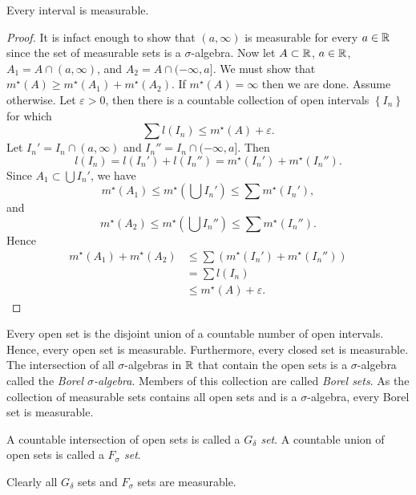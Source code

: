 
\begin{lemma}[]
	Every interval is measurable.
\end{lemma}

\begin{proof}
	It is infact enough to show that $(a, \infty)$ is measurable for every
	$a \in \mathbb{R}$ since the set of measurable sets is a $\sigma$-algebra.
	Now let $A \subset \mathbb{R}$, $a \in \mathbb{R}$, $A_1 = A \cap (a, \infty)$, and
	$A_2 = A \cap (-\infty, a]$.
	We must show that $
		m^\star(A) \geq m^\star(A_1) + m^\star(A_2)
	$.
	If $m^\star(A) = \infty$ then we are done. Assume otherwise.
	Let $\varepsilon > 0$, then there is a countable collection of open
	intervals $\left\{
		I_n
	\right\}$ for which \[
		\sum l(I_n) \leq m^\star(A) + \varepsilon.
	\]
	Let 
	$I_n' = I_n \cap (a, \infty)$ 
	and
	$I_n'' = I_n \cap (-\infty, a]$.
	Then
	\[
		l(I_n) = l(I_n') + l(I_n'') = m^\star(I_n') + m^\star(I_n'').
	\]
	Since $A_1 \subset \bigcup I_n'$, we have
	\[
		m^\star(A_1) \leq m^\star\left( 
			\bigcup I_n' 
		\right)
		\leq \sum m^\star(I_n'),
	\]
	and
	\[
		m^\star(A_2) \leq m^\star\left( 
			\bigcup I_n'' 
		\right)
		\leq \sum m^\star(I_n'').
	\]
	Hence
	\begin{align*}
		m^\star(A_1) + m^\star(A_2)
		&\leq \sum \left( 
			m^\star(I_n') + m^\star(I_n'') 
		\right) \\
		&= \sum l(I_n) \\
		&\leq m^\star(A) + \varepsilon.
	\end{align*}
\end{proof}

Every open set is the disjoint union of a countable number of open intervals.
Hence, every open set is measurable.
Furthermore, every closed set is measurable.
The intersection of all $\sigma$-algebras in $\mathbb{R}$ that contain the open sets is a $\sigma$-algebra called the \emph{Borel $\sigma$-algebra}.
Members of this collection are called \emph{Borel sets}.
As the collection of measurable sets contains all open sets and is a
$\sigma$-algebra, every Borel set is measurable.

\begin{definition}
	A countable intersection of open sets is called a
	\emph{$G_\delta$ set}.
	A countable union of open sets is called a
	\emph{$F_\sigma$ set}.
\end{definition}

Clearly all $G_\delta$ sets and $F_\sigma$ sets are measurable.

